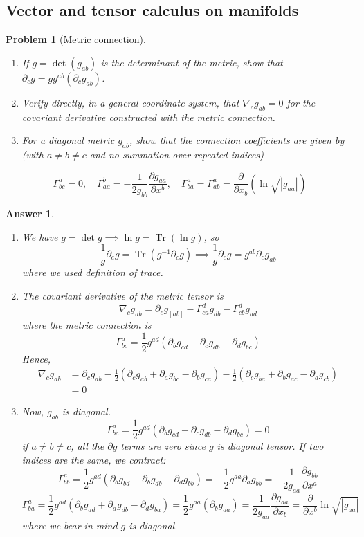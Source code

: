 \documentclass[a4paper]{article}
\DeclareMathOperator{\Tr}{Tr}
\newtheorem{ans}{Answer}[subsection]
\theoremstyle{new}
\newtheorem{qns}{Problem}[section]
\begin{document}
\subsection*{Vector and tensor calculus on manifolds}
\begin{qns}[Metric connection]\leavevmode
\begin{enumerate}[label=(\alph*)]
\item  If $g = \det(g_{ab})$ is the determinant of the metric, show that $\partial_cg = gg^{ab}(\partial_cg_{ab})$.
\item Verify directly, in a general coordinate system, that $\nabla_cg_{ab} = 0$ for the covariant derivative constructed with the metric connection.
\item For a diagonal metric $g_{ab}$, show
that the connection coefficients are given by (with $a\neq b\neq c$ and no summation over
repeated indices)
\end{enumerate}
$$\Gamma_{bc}^a=0,\quad\Gamma_{aa}^b=-\frac{1}{2g_{bb}}\frac{\partial g_{aa}}{\partial x^b},\quad\Gamma_{ba}^a=\Gamma_{ab}^a=\frac{\partial}{\partial x_b}(\ln\sqrt{|g_{aa}|})$$
\end{qns}
\begin{ans}\leavevmode
\begin{enumerate}[label=(\alph*)]
\item We have $g=\det g\implies\ln g=\Tr(\ln g)$, so
$$\frac{1}{g}\partial_cg=\Tr(g^{-1}\partial_cg)\implies\frac{1}{g}\partial_cg=g^{ab}\partial_cg_{ab}$$
where we used definition of trace.
\item The covariant derivative of the metric tensor is
$$\nabla_cg_{ab}=\partial_cg_[ab]-\Gamma_{ca}^dg_{db}-\Gamma_{cb}^dg_{ad}$$
where the metric connection is
$$\Gamma_{bc}^a=\frac{1}{2}g^{ad}(\partial_bg_{cd}+\partial_cg_{db}-\partial_dg_{bc})$$
Hence,
\begin{align}
    \nabla_cg_{ab}&=\partial_cg_{ab}-\frac{1}{2}(\partial_cg_{ab}+\partial_ag_{bc}-\partial_bg_{ca})-\frac{1}{2}(\partial_cg_{ba}+\partial_bg_{ac}-\partial_ag_{cb})\nonumber\\&=0\nonumber
\end{align}
\item Now, $g_{ab}$ is diagonal.
$$\Gamma_{bc}^a=\frac{1}{2}g^{ad}(\partial_bg_{cd}+\partial_cg_{db}-\partial_dg_{bc})=0$$
if $a\neq b\neq c$, all the $\partial g$ terms are zero since $g$ is diagonal tensor. If two indices are the same, we contract:
$$\Gamma_{bb}^a=\frac{1}{2}g^{ad}(\partial_bg_{bd}+\partial_bg_{db}-\partial_dg_{bb})=-\frac{1}{2}g^{aa}\partial_ag_{bb}=-\frac{1}{2g_{aa}}\frac{\partial g_{bb}}{\partial x^a}$$
$$\Gamma_{ba}^a=\frac{1}{2}g^{ad}(\partial_bg_{ad}+\partial_ag_{db}-\partial_dg_{ba})=\frac{1}{2}g^{aa}(\partial_bg_{aa})=\frac{1}{2g_{aa}}\frac{\partial g_{aa}}{\partial x_b}=\frac{\partial}{\partial x^b}\ln\sqrt{|g_{aa}|}$$
where we bear in mind $g$ is diagonal.
\end{enumerate}
\end{ans}
\end{document}
